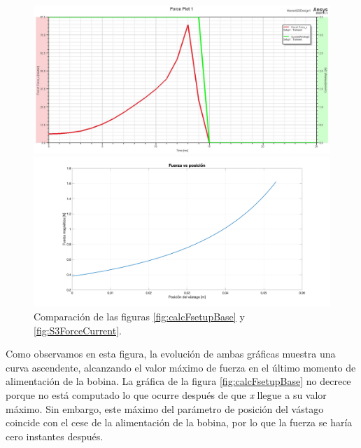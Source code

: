 \begin{figure}[htbp]
    \centering
    \begin{minipage}{0.85\textwidth}
        \centering
        \includegraphics[width=\textwidth]{FigurasMemoria/S3ForceCurrent.jpg}
    \end{minipage}
    \hfill
    \begin{minipage}{0.9\textwidth}
        \centering
        \includegraphics[width=\textwidth]{FigurasMemoria/calcFsetupBase.png}
    \end{minipage}
    \caption{Comparación de las figuras \ref{fig:calcFsetupBase} y \ref{fig:S3ForceCurrent}.}
    \label{fig:comparacionF}
\end{figure}

Como observamos en esta figura, la evolución de ambas gráficas muestra una curva ascendente, alcanzando el valor máximo de fuerza en el último momento de alimentación de la bobina. La gráfica de la figura \ref{fig:calcFsetupBase} no decrece porque no está computado lo que ocurre después de que \textit{x} llegue a su valor máximo. Sin embargo, este máximo del parámetro de posición del vástago coincide con el cese de la alimentación de la bobina, por lo que la fuerza se haría cero instantes después.

